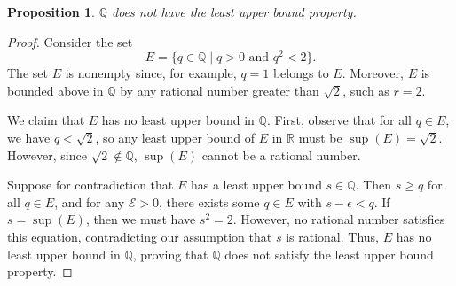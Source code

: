 \documentclass[12pt]{article}
\newtheorem{proposition}{Proposition}
\begin{document}
\noindent 
\begin{proposition}
    \(\mathbb Q\) does not have the least upper bound property.
\end{proposition} 
\begin{proof}
    Consider the set 
    \[
        E = \{ q \in \mathbb{Q} \mid q > 0 \text{ and } q^2 < 2 \}.
    \]
    The set \(E\) is nonempty since, for example, \( q = 1 \) 
    belongs to \( E \). Moreover, \( E \) is bounded above in \( \mathbb{Q} \) 
    by any rational number greater than \( \sqrt{2} \), such as \( r = 2 \).

    \noindent 
    We claim that \( E \) has no least upper bound in \( \mathbb{Q} \). 
    First, observe that for all \( q \in E \), we have \( q < \sqrt{2} \), 
    so any least upper bound of \( E \) in \( \mathbb{R} \) must be 
    \( \sup(E) = \sqrt{2} \). However, since 
    \( \sqrt{2} \not\in \mathbb{Q} \), \( \sup(E) \) cannot be a rational number.

    \noindent 
    Suppose for contradiction that \( E \) has a least upper bound \( s \in \mathbb{Q} \).
    Then \( s \geq q \) for all \( q \in E \), 
    and for any \( \mathcal E > 0 \), 
    there exists some \( q \in E \) with \( s - \epsilon < q \). 
    If \( s = \sup(E) \), then we must have \( s^2 = 2 \). 
    However, no rational number satisfies this equation, contradicting our 
    assumption that \( s \) is rational. Thus, \( E \) has no least upper bound 
    in \( \mathbb{Q} \), proving that \( \mathbb{Q} \) does not satisfy the
    least upper bound property.
\end{proof}
\end{document}
